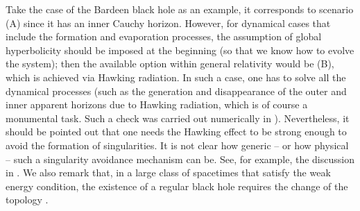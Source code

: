\documentclass[12pt]{article}
\newcommand{\2}{$^2$}
\newcommand{\3}{$^3$}
\newcommand{\4}{$_4$}
\newcommand{\5}{$_5$}
\begin{document}
Take the case of the Bardeen black hole as an example, it corresponds to scenario (A) since it has an inner Cauchy horizon. However, for dynamical cases that include the formation and evaporation processes, the assumption of global hyperbolicity should be imposed at the beginning (so that we know how to evolve the system); then the available option within general relativity would be (B), which is achieved via Hawking radiation. In such a case, one has to solve all the dynamical processes (such as the generation and disappearance of the outer and inner apparent horizons due to Hawking radiation, which is of course a monumental task. Such a check was carried out numerically in \cite{Hwang:2012nn}). {\color{black}Nevertheless, it should be pointed out that one needs the Hawking effect to be strong enough to avoid the formation of singularities. It is not clear how generic -- or how physical -- such a singularity avoidance mechanism can be. See, for example, the discussion in \cite{roman}. We also remark that, in a large class of spacetimes that satisfy the weak energy condition, the existence of a regular black hole requires the change of the topology \cite{9612057}.}
\end{document}
